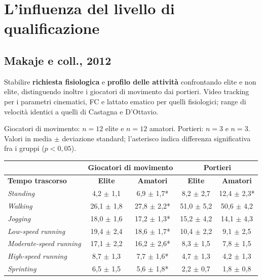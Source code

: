 \section{L'influenza del livello di qualificazione}

\subsection{Makaje e coll., 2012}

Stabilire \textbf{richiesta fisiologica} e \textbf{profilo delle attività} confrontando elite e non
elite, distinguendo inoltre i giocatori di movimento dai portieri. Video tracking per i parametri
cinematici, FC e lattato ematico per quelli fisiologici; range di velocità identici a quelli di
Castagna e D'Ottavio.

Giocatori di movimento: $n = 12$ elite e $n = 12$ amatori. Portieri: $n = 3$ e $n = 3$. Valori in
media $\pm$ deviazione standard; l'asterisco indica differenza significativa fra i gruppi
($p < 0{,}05$).


\begin{center}
\footnotesize
\begin{tabular}{|l|c|c|c|c|}
\hline
 & \multicolumn{2}{c|}{\textbf{Giocatori di movimento}} & \multicolumn{2}{c|}{\textbf{Portieri}} \\
\hline
\textbf{Tempo trascorso} & \textbf{Elite} & \textbf{Amatori} & \textbf{Elite} & \textbf{Amatori} \\
\hline
\textit{Standing}              & 4,2 $\pm$ 1,1  & 6,9 $\pm$ 1,7*  & 8,2 $\pm$ 2,7  & 12,4 $\pm$ 2,3* \\
\textit{Walking}               & 26,1 $\pm$ 1,8 & 27,8 $\pm$ 2,2* & 51,0 $\pm$ 5,2 & 50,6 $\pm$ 4,2 \\
\textit{Jogging}               & 18,0 $\pm$ 1,6 & 17,2 $\pm$ 1,3* & 15,2 $\pm$ 4,2 & 14,1 $\pm$ 4,3 \\
\textit{Low-speed running}     & 19,4 $\pm$ 2,4 & 18,6 $\pm$ 1,7* & 10,4 $\pm$ 2,2 & 9,1 $\pm$ 2,5 \\
\textit{Moderate-speed running}& 17,1 $\pm$ 2,2 & 16,2 $\pm$ 2,6* & 8,3 $\pm$ 1,5  & 7,8 $\pm$ 1,5 \\
\textit{High-speed running}    & 8,7 $\pm$ 1,3  & 7,7 $\pm$ 1,6*  & 4,7 $\pm$ 1,3  & 4,2 $\pm$ 1,3 \\
\textit{Sprinting}             & 6,5 $\pm$ 1,5  & 5,6 $\pm$ 1,8*  & 2,2 $\pm$ 0,7  & 1,8 $\pm$ 0,8 \\
\hline
\end{tabular}
\end{center}


